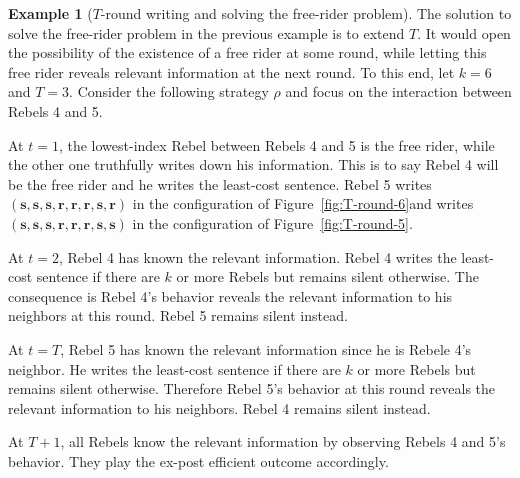 \documentclass[12pt,letter]{article}
\newcommand\omicron{o}
\theoremstyle{definition}
\newtheorem{example}{Example}
\theoremstyle{definition}
\theoremstyle{remark}
\theoremstyle{claim}
\begin{document}
\begin{example}[$T$-round writing and solving the free-rider problem]
\label{ex:cost_function_talk_solve_fr}
The solution to solve the free-rider problem in the previous example is to extend $T$. It would open the possibility of the existence of a free rider at some round, while letting this free rider reveals relevant information at the next round. To this end, let $k=6$ and $T=3$. Consider the following strategy $\rho$ and focus on the interaction between Rebels 4 and 5.

At $t=1$, the lowest-index Rebel between Rebels 4 and 5 is the free rider, while the other one truthfully writes down his information. This is to say Rebel 4 will be the free rider and he writes the least-cost sentence. Rebel 5 writes $(\textbf{s},\textbf{s},\textbf{s},\textbf{r},\textbf{r},\textbf{r},\textbf{s},\textbf{r})$ in the configuration of Figure~\ref{fig:T-round-6}and writes $(\textbf{s},\textbf{s},\textbf{s},\textbf{r},\textbf{r},\textbf{r},\textbf{s},\textbf{s})$ in the configuration of Figure~\ref{fig:T-round-5}. 

At $t=2$, Rebel 4 has known the relevant information. Rebel 4 writes the least-cost sentence if there are $k$ or more Rebels but remains silent otherwise. The consequence is Rebel 4's behavior reveals the relevant information to his neighbors at this round. Rebel 5 remains silent instead. 

At $t=T$, Rebel 5 has known the relevant information since he is Rebele 4's neighbor. He writes the least-cost sentence if there are $k$ or more Rebels but remains silent otherwise. Therefore Rebel 5's behavior at this round reveals the relevant information to his neighbors. Rebel 4 remains silent instead.

At $T+1$, all Rebels know the relevant information by observing Rebels 4 and 5's behavior. They play the ex-post efficient outcome accordingly. 



\end{example}
\end{document}
